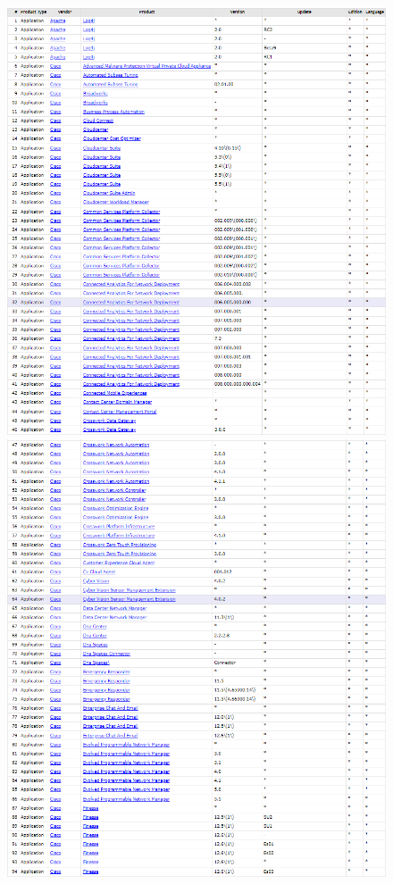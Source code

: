 \documentclass[11t]{article}
\begin{document}
\begin{figure}[H]
    \centering
    \begin{minipage}{0.49\textwidth}
        \centering
        \includegraphics[width=1\textwidth]{images/produtosAfetadosPergunta2_1.png}
    \end{minipage}
    \hfill
    \begin{minipage}{0.49\textwidth}
        \centering
        \includegraphics[width=1\textwidth]{images/produtosAfetadosPergunta2_2.png}

\end{minipage}
\end{figure}
\end{document}
